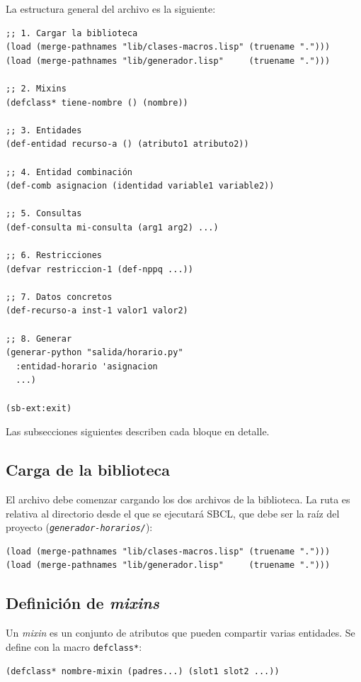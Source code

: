 \documentclass[12pt,a4paper]{article}
\newcommand{\code}[1]{\texttt{#1}}
\newcommand{\file}[1]{\texttt{\textit{#1}}}
\begin{document}
La estructura general del archivo es la siguiente:

\begin{lstlisting}[style=lisp, caption={Estructura del archivo de dominio}]
;; 1. Cargar la biblioteca
(load (merge-pathnames "lib/clases-macros.lisp" (truename ".")))
(load (merge-pathnames "lib/generador.lisp"     (truename ".")))

;; 2. Mixins
(defclass* tiene-nombre () (nombre))

;; 3. Entidades
(def-entidad recurso-a () (atributo1 atributo2))

;; 4. Entidad combinación
(def-comb asignacion (identidad variable1 variable2))

;; 5. Consultas
(def-consulta mi-consulta (arg1 arg2) ...)

;; 6. Restricciones
(defvar restriccion-1 (def-nppq ...))

;; 7. Datos concretos
(def-recurso-a inst-1 valor1 valor2)

;; 8. Generar
(generar-python "salida/horario.py"
  :entidad-horario 'asignacion
  ...)

(sb-ext:exit)
\end{lstlisting}

Las subsecciones siguientes describen cada bloque en detalle.

\subsection{Carga de la biblioteca}

El archivo debe comenzar cargando los dos archivos de la biblioteca.
La ruta es relativa al directorio desde el que se ejecutará SBCL,
que debe ser la raíz del proyecto (\file{generador-horarios/}):

\begin{lstlisting}[style=lisp, caption={Carga de la biblioteca}]
(load (merge-pathnames "lib/clases-macros.lisp" (truename ".")))
(load (merge-pathnames "lib/generador.lisp"     (truename ".")))
\end{lstlisting}

\subsection{Definición de \textit{mixins}}

Un \textit{mixin} es un conjunto de atributos que pueden compartir varias
entidades. Se define con la macro \code{defclass*}:

\begin{lstlisting}[style=lisp, caption={Sintaxis de defclass*}]
(defclass* nombre-mixin (padres...) (slot1 slot2 ...))
\end{lstlisting}
\end{document}
